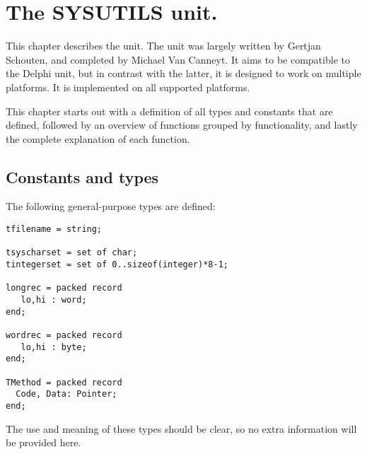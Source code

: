 %
%
%
%
%
\chapter{The SYSUTILS unit.}

This chapter describes the  unit. The  unit 
was largely written by Gertjan Schouten, and completed by Michael Van Canneyt. 
It aims to be compatible to the Delphi  unit, but in contrast 
with  the latter, it is designed to work on multiple platforms. It is implemented
on all supported platforms.

This chapter starts out with a definition of all types and constants 
that are defined, followed by an overview of functions grouped by
functionality, and lastly the complete explanation of each function.

\section{Constants and types}
The following general-purpose types are defined:
\begin{verbatim}
tfilename = string;

tsyscharset = set of char;
tintegerset = set of 0..sizeof(integer)*8-1;
    
longrec = packed record
   lo,hi : word;
end;

wordrec = packed record   
   lo,hi : byte;
end;

TMethod = packed record
  Code, Data: Pointer;
end;
\end{verbatim}
The use and meaning of these types should be clear, so no extra information
will be provided here.

